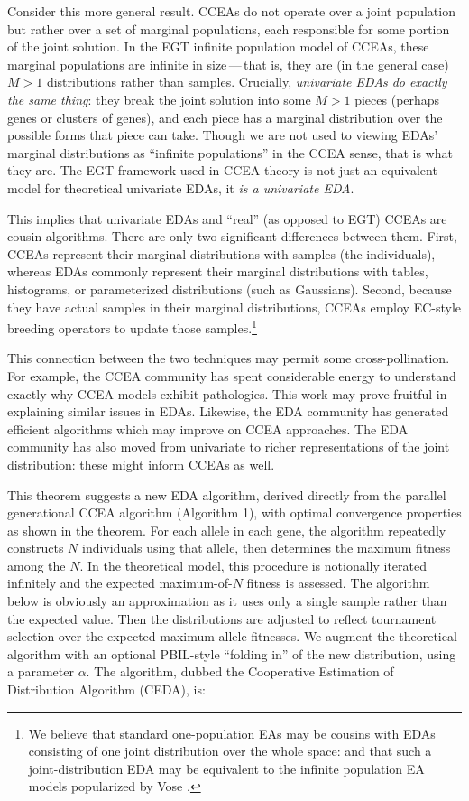 \documentclass{sig-alt-full}
\begin{document}
Consider this more general result.  CCEAs do not operate over a joint population but rather over a set of marginal populations, each responsible for some portion of the joint solution.  In the EGT infinite population model of CCEAs, these marginal populations are infinite in size\,---\,that is, they are (in the general case) \(M >1 \) distributions rather than samples.  Crucially, {\it univariate EDAs do exactly the same thing}: they break the joint solution into some \(M > 1\) pieces (perhaps genes or clusters of genes), and each piece has a marginal distribution over the possible forms that piece can take.  Though we are not used to viewing EDAs' marginal distributions as ``infinite populations'' in the CCEA sense, that is what they are. The EGT framework used in CCEA theory is not just an equivalent model for theoretical univariate EDAs, it {\it is a univariate EDA}.

This implies that univariate EDAs and ``real'' (as opposed to EGT) CCEAs are cousin algorithms.  There are only two significant differences between them.  First, CCEAs represent their marginal distributions with samples (the individuals), whereas EDAs commonly represent their marginal distributions with tables, histograms, or parameterized distributions (such as Gaussians).  Second, because they have actual samples in their marginal distributions, CCEAs employ EC-style breeding operators to update those samples.\footnote{We believe that standard one-population EAs may be cousins with EDAs consisting of one joint distribution over the whole space: and that such a joint-distribution EDA may be equivalent to the infinite population EA models popularized by Vose \cite{vose}.}

This connection between the two techniques may permit some cross-pollination.  For example, the CCEA community has spent considerable energy to understand exactly why CCEA models exhibit pathologies. This work may prove fruitful in explaining similar issues in EDAs.  Likewise, the EDA community has generated efficient algorithms which may improve on CCEA approaches.  The EDA community has also moved from univariate to richer representations of the joint distribution: these might inform CCEAs as well.

This theorem suggests a new EDA algorithm, derived directly from the parallel generational CCEA algorithm (Algorithm 1), with optimal convergence properties as shown in the theorem.  For each allele in each gene, the algorithm repeatedly constructs \(N\) individuals using that allele, then determines the maximum fitness among the \(N\).  In the theoretical model, this procedure is notionally iterated infinitely and the expected maximum-of-\(N\) fitness is assessed.  The algorithm below is obviously an approximation as it uses only a single sample rather than the expected value.  Then the distributions are adjusted to reflect tournament selection over the expected maximum allele fitnesses.  We augment the theoretical algorithm with an optional PBIL-style ``folding in'' of the new distribution, using a parameter \(\alpha\).  The algorithm, dubbed the Cooperative Estimation of Distribution Algorithm (CEDA), is:
\end{document}
